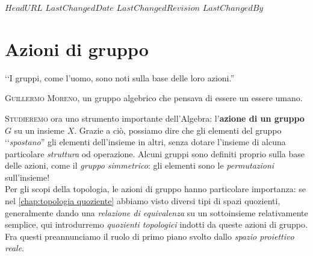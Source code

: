 \svnidlong
{$HeadURL$}
{$LastChangedDate$}
{$LastChangedRevision$}
{$LastChangedBy$}

\chapter{Azioni di gruppo}

\begin{introduction}
‘‘I gruppi, come l'uomo, sono noti sulla base delle loro azioni.''
\begin{flushright}
	\textsc{Guillermo Moreno,} un gruppo algebrico che pensava di essere un essere umano.
\end{flushright}
\end{introduction}
\lettrine[findent=1pt, nindent=0pt]{S}{tudieremo} ora uno strumento importante dell'Algebra: l'\textbf{azione di un gruppo} $G$ su un insieme $X$. Grazie a ciò, possiamo dire che gli elementi del gruppo ‘‘\textit{spostano}'' gli elementi dell'insieme in altri, senza dotare l'insieme di alcuna particolare \textit{struttura} od operazione. Alcuni gruppi sono definiti proprio sulla base delle azioni, come il \textit{gruppo simmetrico}: gli elementi sono le \textit{permutazioni} sull'insieme!\\
Per gli scopi della topologia, le azioni di gruppo hanno particolare importanza: se nel \autoref{chap:topologia quoziente} abbiamo visto diversi tipi di spazi quozienti, generalmente dando una \textit{relazione di equivalenza} su un sottoinsieme relativamente semplice, qui introdurremo \textit{quozienti topologici} indotti da queste azioni di gruppo. Fra questi preannunciamo il ruolo di primo piano svolto dallo \textit{spazio proiettivo reale}.
